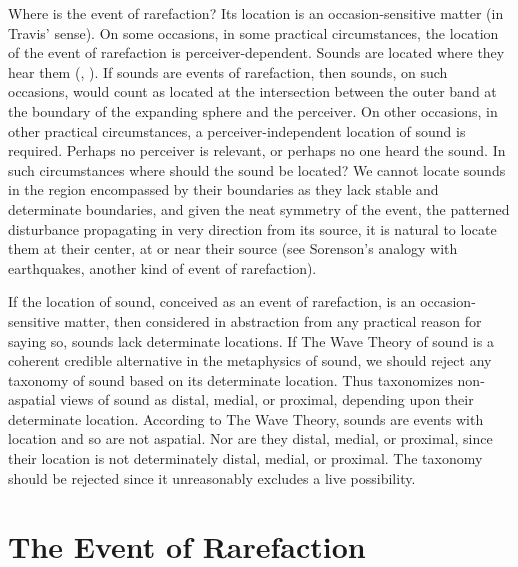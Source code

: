 \documentclass[12pt]{article}
\begin{document}
Where is the event of rarefaction? Its location is an occasion-sensitive matter (in Travis' \citeyear{Travis:2008la} sense). On some occasions, in some practical circumstances, the location of the event of rarefaction is perceiver-dependent. Sounds are located where they hear them (\citealt{Nudds:2009sf}, \citealt{OShaughnessy:2009aa}). If sounds are events of rarefaction, then sounds, on such occasions, would count as located at the intersection between the outer band at the boundary of the expanding sphere and the perceiver. On other occasions, in other practical circumstances, a perceiver-independent location of sound is required. Perhaps no perceiver is relevant, or perhaps no one heard the sound. In such circumstances where should the sound be located? We cannot locate sounds in the region encompassed by their boundaries as they lack stable and determinate boundaries, and given the neat symmetry of the event, the patterned disturbance propagating in very direction from its source, it is natural to locate them at their center, at or near their source (see Sorenson's \citeyear{Sorensen:2009aa} analogy with earthquakes, another kind of event of rarefaction).

If the location of sound, conceived as an event of rarefaction, is an occasion-sensitive matter, then considered in abstraction from any practical reason for saying so, sounds lack determinate locations. If The Wave Theory of sound is a coherent credible alternative in the metaphysics of sound, we should reject any taxonomy of sound based on its determinate location. Thus \citet{Casati:2014hw} taxonomizes non-aspatial views of sound as distal, medial, or proximal, depending upon their determinate location. According to The Wave Theory, sounds are events with location and so are not aspatial. Nor are they distal, medial, or proximal, since their location is not determinately distal, medial, or proximal. The taxonomy should be rejected since it unreasonably excludes a live possibility.



\section{The Event of Rarefaction} %
\label{sec:the_event_of_rarefaction}
\end{document}
